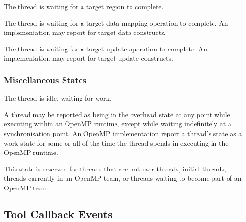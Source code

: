 \begin{description}

\item {} 

  The thread is waiting for a target region to complete.
  
\item {} 

  The thread is waiting for a target data mapping operation to complete. 
  An implementation may report  
  for target data constructs.

\item {} 

  The thread is waiting for a target  update operation to complete. 
  An implementation may report  
  for target update constructs.

\end{description}


\subsubsection{Miscellaneous States}

\begin{description}
\item {} 

  The thread is idle, waiting for work.

\item {} 

  A thread may be reported as being in the overhead state at any point while 
  executing within an OpenMP runtime, except while waiting indefinitely
  at a synchronization point.
  An OpenMP implementation report a thread's state as a work state for
  some or all of the time the thread spends in executing in the OpenMP runtime.

\item {} 

  This state is reserved for threads that are not user threads,
  initial threads, threads currently in an OpenMP team, or threads
  waiting to become part of an OpenMP team.

\end{description}

\subsection{Tool Callback Events}
\label{sec:ompt_event_t}

